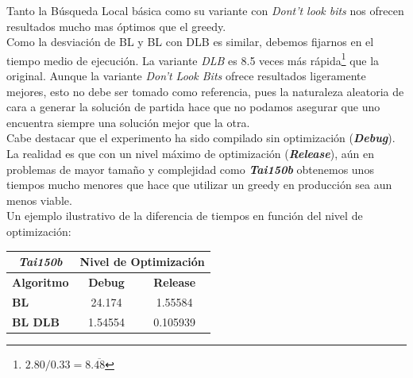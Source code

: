 \documentclass[a4paper, 12pt]{article}
\begin{document}
      Tanto la Búsqueda Local básica como su variante con \textit{Dont't look bits} nos ofrecen resultados mucho mas óptimos que el greedy. \\
      
      Como la desviación de BL y BL con DLB es similar, debemos fijarnos en el tiempo medio de ejecución. La variante \textit{DLB} es 8.5 veces más rápida\footnote{$2.80/0.33 = 8.\overline{48}$} que la original. Aunque la variante \textit{Don't Look Bits} ofrece resultados ligeramente mejores, esto no debe ser tomado como referencia, pues la naturaleza aleatoria de cara a generar la solución de partida hace que no podamos asegurar que uno encuentra siempre una solución mejor que la otra.\\
      
      Cabe destacar que el experimento ha sido compilado sin optimización (\textbf{\textit{Debug}}). La realidad es que con un nivel máximo de optimización (\textbf{\textit{Release}}), aún en problemas de mayor tamaño y complejidad como \textbf{\textit{Tai150b}} obtenemos unos tiempos mucho menores que hace que utilizar un greedy en producción sea aun menos viable.\\
      
      Un ejemplo ilustrativo de la diferencia de tiempos en función del nivel de optimización:
      
\begin{table}[H]
\centering
\label{my-label}
\begin{tabular}{l|c|c|}
\cline{2-3}
\multicolumn{1}{c|}{{\textit{Tai150b}}} & \multicolumn{2}{c|}{\textbf{Nivel de Optimización}} \\ \hline
\multicolumn{1}{|c|}{\textbf{Algoritmo}}    & \textbf{Debug}          & \textbf{Release}          \\ \hline
\multicolumn{1}{|l|}{\textbf{BL}}           & 24.174                  & 1.55584                   \\ \hline
\multicolumn{1}{|l|}{\textbf{BL DLB}}       & 1.54554                 & 0.105939                  \\ \hline
\end{tabular}
\end{table}
\end{document}
